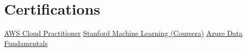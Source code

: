 \documentclass[a4paper,10pt]{article}
\begin{document}
\section{\textbf{Certifications}}
\footnotesize{
\href{https://drive.google.com/file/d/1a3exoiS79RS3q8vSJHT-PpkczSPg54EZ/view}{AWS Cloud Practitioner} \hfill \href{https://drive.google.com/file/d/1At3BLkqJ9vuhPPUCcrNAw9yNH5li7XdQ/view}{Stanford Machine Learning (Coursera)} \hfill \href{https://drive.google.com/file/d/1VBJjfRMsIm8BckoUtLUV7ZbY88Jju2qT/view}{Azure Data Fundamentals}
}
\end{document}
